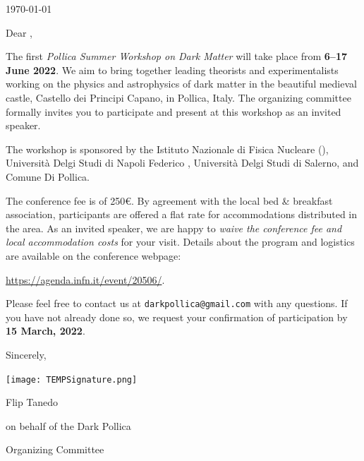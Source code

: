 \documentclass[12pt]{article}
\newcommand{\participant}{\participantname\xspace}
\newcommand{\participant}{participant\xspace}
\newcommand{\invitationline}{The organizing committee formally invites you to participate and present at this workshop as an invited speaker.\xspace}
\newcommand{\localexpenses}{As an invited speaker, we are happy to \emph{waive the conference fee and local accommodation costs} for your visit.\xspace}
\newcommand{\invitationline}{The organizing committee formally invites you to participate it this workshop.\xspace}
\newcommand{\localexpenses}{}
\begin{document}
\thispagestyle{flipsfirstpage} 	%
\vspace*{.25in}
\today
\bigskip  


Dear \participant, \par \bigskip 

The first \emph{Pollica Summer Workshop on Dark Matter} will take place from \textbf{6--17 June 2022}. We aim to bring together leading theorists and experimentalists working on the physics and astrophysics of dark matter in the beautiful medieval castle, Castello dei Principi Capano, in Pollica, Italy. \invitationline

The workshop is sponsored by the Istituto Nazionale di Fisica Nucleare (), Università Delgi Studi di Napoli Federico , Università Delgi Studi di Salerno, and Comune Di Pollica.

The conference fee is of 250€. By agreement with the local bed \& breakfast association, participants are offered a flat rate for accommodations distributed in the area. 
%
\localexpenses
% 
Details about the program and logistics are available on the conference webpage: 

\url{https://agenda.infn.it/event/20506/}.


Please feel free to contact us at \texttt{darkpollica@gmail.com} with any questions. If you have not already done so, we request your confirmation of participation by \textbf{15 March, 2022}.



\vspace{1cm}
\hspace{.5\textwidth}
\begin{minipage}[]{5in}
Sincerely, \par \medskip


\texttt{[image: TEMPSignature.png]} \par
Flip Tanedo \par
on behalf of the Dark Pollica\par
Organizing Committee
\end{minipage}
\vspace{2cm}
\end{document}
